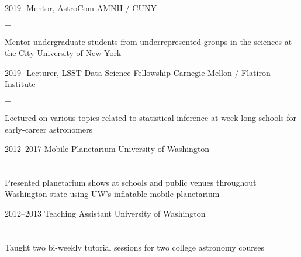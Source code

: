 \documentclass[]{luger-cv} %
\begin{document}
\begin{entrylist}


\entry
{2019-}
{Mentor, AstroCom}
{AMNH / CUNY}
{%
\vspace{-1em}
\begin{list}{$+$}{\cvlist}
\item Mentor undergraduate students from underrepresented groups in the sciences
at the City University of New York
\end{list}
}


\entry
{2019-}
{Lecturer, LSST Data Science Fellowship}
{Carnegie Mellon / Flatiron Institute}
{%
\vspace{-1em}
\begin{list}{$+$}{\cvlist}
\item Lectured on various topics related to statistical 
inference at week-long schools for early-career astronomers
\end{list}
}


\entry
{2012--2017}
{Mobile Planetarium}
{University of Washington}
{%
\vspace{-1em}
\begin{list}{$+$}{\cvlist}
\item Presented planetarium shows at schools and public venues throughout
Washington state using UW's inflatable mobile planetarium
\end{list}
}


\entry
{2012--2013}
{Teaching Assistant}
{University of Washington}
{%
\vspace{-1em}
\begin{list}{$+$}{\cvlist}
\item Taught two bi-weekly tutorial sessions for two college astronomy courses
\end{list}
}


\ifdefined \onepage \else
\end{entrylist}
%
%
\end{document}
